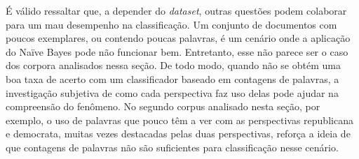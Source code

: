 É válido ressaltar que, a depender do \emph{dataset}, outras questões podem colaborar para um mau desempenho na classificação. Um conjunto de documentos com poucos exemplares, ou contendo poucas palavras, é um cenário onde a aplicação do Naïve Bayes pode não funcionar bem. Entretanto, esse não parece ser o caso dos corpora analisados nessa seção. De todo modo, quando não se obtém uma boa taxa de acerto com um classificador baseado em contagens de palavras, a investigação subjetiva de como cada perspectiva faz uso delas pode ajudar na compreensão do fenômeno. No segundo corpus analisado nesta seção, por exemplo, o uso de palavras que pouco têm a ver com as perspectivas republicana e democrata, muitas vezes destacadas pelas duas perspectivas, reforça a ideia de que contagens de palavras não são suficientes para classificação nesse cenário. %






